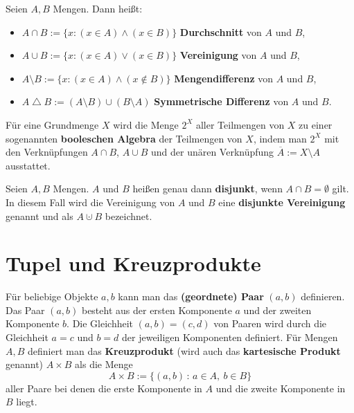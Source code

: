\begin{defn}
Seien $ A,B $ Mengen. Dann heißt:
\begin{itemize}
\item $ A \cap B := \{ x : (x \in A) \wedge (x \in B) \} $ \textbf{Durchschnitt} von $ A $ und $ B $,
\item $ A \cup B := \{ x : (x \in A) \vee (x \in B) \} $ \textbf{Vereinigung} von $ A $ und $ B $,
\item $ A \setminus B := \{ x : (x \in A) \wedge (x \notin B) \} $ \textbf{Mengendifferenz} von $ A $ und $ B $,
\item $A \operatorname{\triangle} B := (A \setminus B) \cup (B \setminus A)$ \textbf{Symmetrische Differenz} von $A$ und $B$. 
\end{itemize}
\end{defn}

\begin{bem}
	Für eine Grundmenge $X$ wird die Menge $2^X$ aller Teilmengen von $X$ zu einer sogenannten \textbf{booleschen Algebra} der Teilmengen von $X$, indem man $2^X$ mit den Verknüpfungen $A \cap B$, $A \cup B$ und der unären Verknüpfung $\overline{A} := X \setminus A$ ausstattet. 
\end{bem} 

\begin{defn}
Seien $ A,B $ Mengen. $ A $ und $ B $ heißen genau dann \textbf{disjunkt}, wenn $ A \cap B = \emptyset $ gilt. In diesem Fall wird die Vereinigung von $A$ und $B$ eine  \textbf{disjunkte Vereinigung} genannt
und als $A \cupdot B$ bezeichnet. 
\end{defn}

\section{Tupel und Kreuzprodukte}

\begin{defn} 
	Für beliebige Objekte $ a,b $ kann man das \textbf{(geordnete) Paar} $ (a,b) $ definieren. Das Paar $(a,b)$ besteht aus der ersten Komponente $a$ und der zweiten Komponente $b$. 
	Die Gleichheit $ (a,b) = (c,d) $ von Paaren wird durch die Gleichheit $ a=c $ und $ b=d $ der jeweiligen Komponenten definiert.  Für Mengen $ A,B $ definiert man das \textbf{Kreuzprodukt} (wird auch das \textbf{kartesische Produkt} genannt) $ A \times B $ als die Menge
	\[
	A \times B := \{ (a,b) \,:\, a \in A, \ b \in B \}
	\]
	aller Paare bei denen die erste Komponente in $A$ und die zweite Komponente in $B$ liegt. 
\end{defn} 

